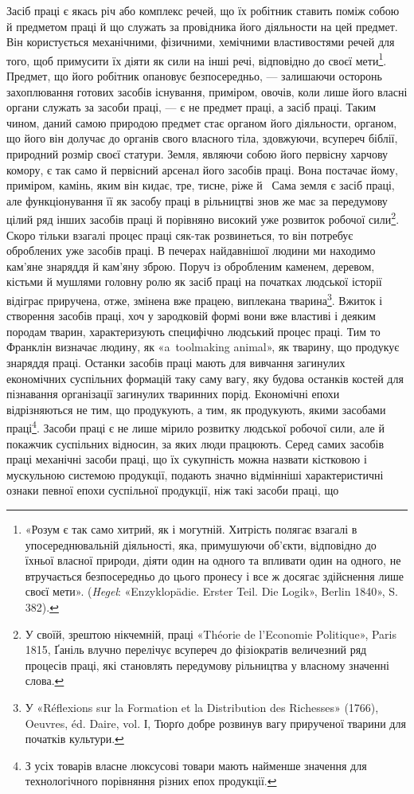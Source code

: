 Засіб праці є якась річ або комплекс речей, що їх робітник
ставить поміж собою й предметом праці й що служать за провідника
його діяльности на цей предмет. Він користується механічними,
фізичними, хемічними властивостями речей для того, щоб
примусити їх діяти як сили на інші речі, відповідно до своєї мети\footnote{
«Розум є так само хитрий, як і могутній. Хитрість полягає взагалі
в упосереднювальній діяльності, яка, примушуючи об’єкти, відповідно
до їхньої власної природи, діяти один на одного та впливати один на
одного, не втручається безпосередньо до цього пронесу і все ж досягає
здійснення лише своєї мети». (\emph{Hegel}: «Enzyklopädie. Erster Teil. Die
Logik», Berlin 1840», S. 382).
}.
Предмет, що його робітник опановує безпосередньо, — залишаючи
осторонь захоплювання готових засобів існування, приміром,
овочів, коли лише його власні органи служать за засоби праці, —
є не предмет праці, а засіб праці. Таким чином, даний самою
природою предмет стає органом його діяльности, органом, що
його він долучає до органів свого власного тіла, здовжуючи,
всупереч біблії, природний розмір своєї статури. Земля, являючи
собою його первісну харчову комору, є так само й первісний арсенал
його засобів праці. Вона постачає йому, приміром, камінь,
яким він кидає, тре, тисне, ріже й~ Сама земля є засіб праці,
але функціонування її як засобу праці в рільництві знов же
має за передумову цілий ряд інших засобів праці й порівняно
високий уже розвиток робочої сили\footnote{
У своїй, зрештою нікчемній, праці «Théorie de l’Economie Politique»,
Paris 1815, Ґаніль влучно перелічує всупереч до фізіократів величезний
ряд процесів праці, які становлять передумову рільництва у власному
значенні слова.
}. Скоро тільки взагалі процес
праці сяк-так розвинеться, то він потребує оброблених уже засобів
праці. В печерах найдавнішої людини ми находимо кам’яне
знаряддя й кам’яну зброю. Поруч із обробленим каменем, деревом,
кістьми й мушлями головну ролю як засіб праці на початках
людської історії відіграє приручена, отже, змінена вже працею,
виплекана тварина\footnote{
У «Réflexions sur la Formation et la Distribution des Richesses»
(1766), Oeuvres, éd. Daire, vol. І, Тюрґо добре розвинув вагу прирученої
тварини для початків культури.
}. Вжиток і створення засобів праці,
хоч у зародковій формі вони вже властиві і деяким породам тварин,
характеризують специфічно людський процес праці. Тим
то Франклін визначає людину, як «a~toolmaking animal», як
тварину, що продукує знаряддя праці. Останки засобів праці
мають для вивчання загинулих економічних суспільних формацій
таку саму вагу, яку будова останків костей для пізнавання організації
загинулих тваринних порід. Економічні епохи відрізняються
не тим, що продукують, а тим, як продукують, якими
засобами праці\footnote{
З усіх товарів власне люксусові товари мають найменше значення
для технологічного порівняння різних епох продукції.
}. Засоби праці є не лише мірило розвитку людської
робочої сили, але й покажчик суспільних відносин, за яких
люди працюють. Серед самих засобів праці механічні засоби праці,
що їх сукупність можна назвати кістковою і мускульною системою
продукції, подають значно відмінніші характеристичні ознаки
певної епохи суспільної продукції, ніж такі засоби праці, що
\parbreak{}  %
